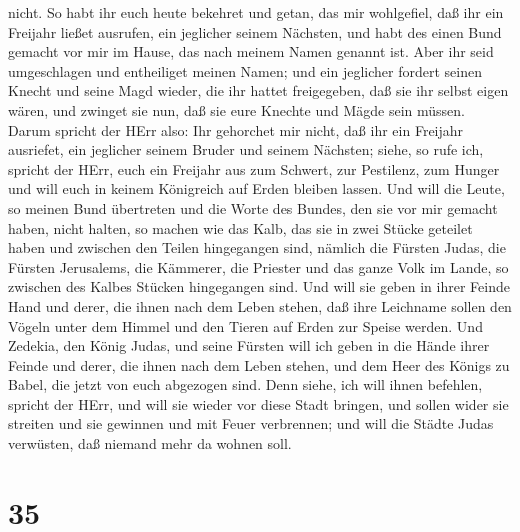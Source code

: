 nicht.  So habt ihr euch heute bekehret und getan, das mir
wohlgefiel, daß ihr ein Freijahr ließet ausrufen, ein jeglicher seinem
Nächsten, und habt des einen Bund gemacht vor mir im Hause, das nach
meinem Namen genannt ist.  Aber ihr seid umgeschlagen und
entheiliget meinen Namen; und ein jeglicher fordert seinen Knecht und
seine Magd wieder, die ihr hattet freigegeben, daß sie ihr selbst eigen
wären, und zwinget sie nun, daß sie eure Knechte und Mägde sein müssen.
 Darum spricht der HErr also: Ihr gehorchet mir nicht, daß
ihr ein Freijahr ausriefet, ein jeglicher seinem Bruder und seinem
Nächsten; siehe, so rufe ich, spricht der HErr, euch ein Freijahr aus
zum Schwert, zur Pestilenz, zum Hunger und will euch in keinem
Königreich auf Erden bleiben lassen.  Und will die Leute,
so meinen Bund übertreten und die Worte des Bundes, den sie vor mir
gemacht haben, nicht halten, so machen wie das Kalb, das sie in zwei
Stücke geteilet haben und zwischen den Teilen hingegangen sind,
 nämlich die Fürsten Judas, die Fürsten Jerusalems, die
Kämmerer, die Priester und das ganze Volk im Lande, so zwischen des
Kalbes Stücken hingegangen sind.  Und will sie geben in
ihrer Feinde Hand und derer, die ihnen nach dem Leben stehen, daß ihre
Leichname sollen den Vögeln unter dem Himmel und den Tieren auf Erden
zur Speise werden.  Und Zedekia, den König Judas, und seine
Fürsten will ich geben in die Hände ihrer Feinde und derer, die ihnen
nach dem Leben stehen, und dem Heer des Königs zu Babel, die jetzt von
euch abgezogen sind.  Denn siehe, ich will ihnen befehlen,
spricht der HErr, und will sie wieder vor diese Stadt bringen, und
sollen wider sie streiten und sie gewinnen und mit Feuer verbrennen; und
will die Städte Judas verwüsten, daß niemand mehr da wohnen soll.

\hypertarget{section-34}{%
\section{35}\label{section-34}}

